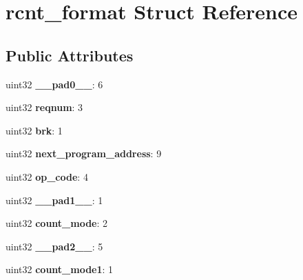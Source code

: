 \hypertarget{structrcnt__format}{}\section{rcnt\+\_\+format Struct Reference}
\label{structrcnt__format}
\subsection*{Public Attributes}
\begin{DoxyCompactItemize}
\item 
\mbox{\label{structrcnt__format_aa0dfa78114139cd24225e82ad0172d89}} 
uint32 {\bfseries \+\_\+\+\_\+pad0\+\_\+\+\_\+}\+: 6
\item 
\mbox{\label{structrcnt__format_a41cfd450d3787369defff0b24e380bb7}} 
uint32 {\bfseries reqnum}\+: 3
\item 
\mbox{\label{structrcnt__format_a0fb6346577d5cda4e260ffca328e6dd0}} 
uint32 {\bfseries brk}\+: 1
\item 
\mbox{\label{structrcnt__format_a540f0c5a6311018e3aab197c2581b04f}} 
uint32 {\bfseries next\+\_\+program\+\_\+address}\+: 9
\item 
\mbox{\label{structrcnt__format_ae148cce019e62cb5052f98a9cfbab13b}} 
uint32 {\bfseries op\+\_\+code}\+: 4
\item 
\mbox{\label{structrcnt__format_a3f2e241af483d2c61f9d055d506831e1}} 
uint32 {\bfseries \+\_\+\+\_\+pad1\+\_\+\+\_\+}\+: 1
\item 
\mbox{\label{structrcnt__format_a11bbd596b543a56323435e2f03f794a1}} 
uint32 {\bfseries count\+\_\+mode}\+: 2
\item 
\mbox{\label{structrcnt__format_a3f4d5a7c258c04e035d141fa084aa7db}} 
uint32 {\bfseries \+\_\+\+\_\+pad2\+\_\+\+\_\+}\+: 5
\item 
\mbox{\label{structrcnt__format_a77dacd851d1e63575fc4a0e7fb2a61db}} 
uint32 {\bfseries count\+\_\+mode1}\+: 1
\item 

\end{DoxyCompactItemize}
